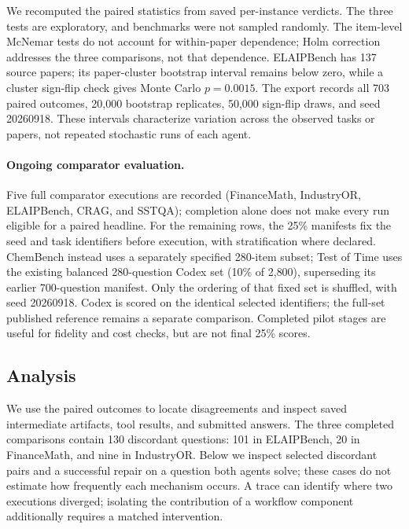 We recomputed the paired statistics from saved per-instance verdicts. The three tests are
exploratory, and benchmarks were not sampled randomly. The item-level McNemar tests do not account for within-paper dependence; Holm correction
addresses the three comparisons, not that dependence. ELAIPBench has 137 source papers;
its paper-cluster bootstrap interval remains below zero, while a cluster sign-flip check gives
Monte Carlo $p=0.0015$. The export records all 703 paired outcomes, 20{,}000 bootstrap replicates,
50{,}000 sign-flip draws, and seed 20260918. These intervals characterize variation across the
observed tasks or papers, not repeated stochastic runs of each agent.

\paragraph{Ongoing comparator evaluation.}
Five full comparator executions are recorded (FinanceMath, IndustryOR, ELAIPBench, CRAG, and
SSTQA); completion alone does not make every run eligible for a paired headline. For the remaining
rows, the 25\% manifests fix the seed and task identifiers before execution, with stratification
where declared. ChemBench instead uses a separately specified 280-item subset; Test of Time
uses the existing balanced 280-question Codex set (10\% of 2{,}800), superseding its earlier
700-question manifest. Only the ordering of that fixed set is shuffled, with seed 20260918.
Codex is scored
on the identical selected identifiers; the full-set published reference remains a separate
comparison. Completed pilot stages are useful for fidelity and cost checks, but are not final
25\% scores. 

\subsection{Analysis}
\label{sec:analysis}

We use the paired outcomes to locate disagreements and inspect saved intermediate artifacts,
tool results, and submitted answers. The three completed comparisons contain 130 discordant
questions: 101 in ELAIPBench, 20 in FinanceMath, and nine in IndustryOR. Below we inspect
selected discordant pairs and a successful repair on a question both agents solve; these cases
do not estimate how frequently each mechanism occurs. A trace can identify where two executions diverged; isolating the contribution of a
workflow component additionally requires a matched intervention.

